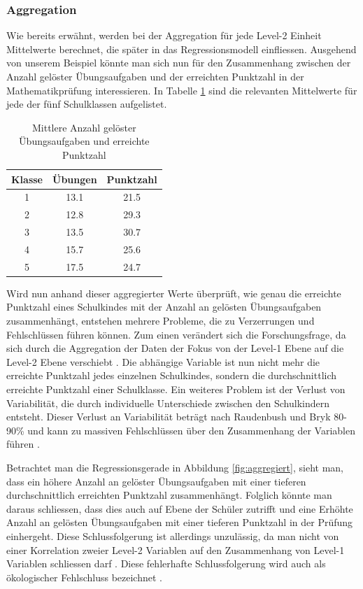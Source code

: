 \documentclass[12pt]{article}\usepackage[]{graphicx}\usepackage[]{color}
\numberwithin{equation}{section}
\begin{document}
\subsubsection{Aggregation}
Wie bereits erwähnt, werden bei der Aggregation für jede Level-2 Einheit Mittelwerte berechnet, die später in das Regressionsmodell einfliessen. Ausgehend von unserem Beispiel könnte man sich nun für den Zusammenhang zwischen der Anzahl gelöster Übungsaufgaben und der erreichten Punktzahl in der Mathematikprüfung interessieren. In Tabelle \ref{tab:aggregation} sind die relevanten Mittelwerte für jede der fünf Schulklassen aufgelistet.

\begin{table}[b]
\centering
\caption{Mittlere Anzahl gelöster Übungsaufgaben und erreichte Punktzahl}
\vspace{5mm}
\begin{tabular}{ccc}
  \hline
Klasse & Übungen & Punktzahl \\ 
  \hline
1 & 13.1 & 21.5 \\ 
2 & 12.8 & 29.3 \\ 
3 & 13.5 & 30.7 \\ 
4 & 15.7 & 25.6 \\ 
5 & 17.5 & 24.7 \\ 
   \hline
\end{tabular}
\label{tab:aggregation}
\end{table}

Wird nun anhand dieser aggregierter Werte überprüft, wie genau die erreichte Punktzahl eines Schulkindes mit der Anzahl an gelösten Übungsaufgaben zusammenhängt, entstehen mehrere Probleme, die zu Verzerrungen und Fehlschlüssen führen können. Zum einen verändert sich die Forschungsfrage, da sich durch die Aggregation der Daten der Fokus von der Level-1 Ebene auf die Level-2 Ebene verschiebt \citep{SnijdersTomA.B2012Ma:a, woltman2012introduction}. Die abhängige Variable ist nun nicht mehr die erreichte Punktzahl jedes einzelnen Schulkindes, sondern die durchschnittlich erreichte Punktzahl einer Schulklasse. Ein weiteres Problem ist der Verlust von Variabilität, die durch individuelle Unterschiede zwischen den Schulkindern entsteht. Dieser Verlust an Variabilität beträgt nach Raudenbush und Bryk 80-90\% und kann zu massiven Fehlschlüssen über den Zusammenhang der Variablen führen \citeyearpar{raudenbush2002hierarchical}. 

Betrachtet man die Regressionsgerade in Abbildung \ref{fig:aggregiert}, sieht man, dass ein höhere Anzahl an gelöster Übungsaufgaben mit einer tieferen durchschnittlich erreichten Punktzahl zusammenhängt. Folglich könnte man daraus schliessen, dass dies auch auf Ebene der Schüler zutrifft und eine Erhöhte Anzahl an gelösten Übungsaufgaben mit einer tieferen Punktzahl in der Prüfung einhergeht. Diese Schlussfolgerung ist allerdings unzulässig, da man nicht von einer Korrelation zweier Level-2 Variablen auf den Zusammenhang von Level-1 Variablen schliessen darf \citep{SnijdersTomA.B2012Ma:a}.  Diese fehlerhafte Schlussfolgerung wird auch als ökologischer Fehlschluss bezeichnet \citep{robinson2009ecological}.
\end{document}
